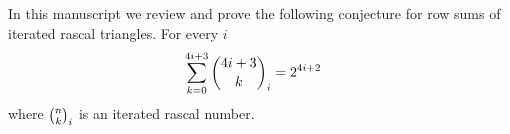 In this manuscript we review and prove the following conjecture for row sums of iterated rascal triangles.
For every $i$
\begin{align*}
    \sum_{k=0}^{4i+3} \binom{4i+3}{k}_{i} &= 2^{4i+2}
\end{align*}
where $\binom{n}{k}_{i}$ is an iterated rascal number.
